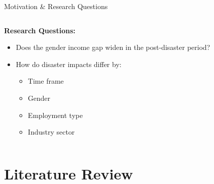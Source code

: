 \documentclass[serif, aspectratio=169]{beamer}
\begin{document}
\begin{frame}{Motivation \& Research Questions}
\begin{columns}[T]
        \begin{column}{0.5\textwidth}
            \textbf{Research Questions:}
            \begin{itemize}\small
                \item Does the gender income gap widen in the post-disaster period?
                \item How do disaster impacts differ by:
                    \begin{itemize}\footnotesize
                        \item Time frame
                        \item Gender
                        \item Employment type
                        \item Industry sector
                    \end{itemize}
            \end{itemize}
        \end{column}
    \end{columns}
\end{frame}

\section{Literature Review}
\end{document}

